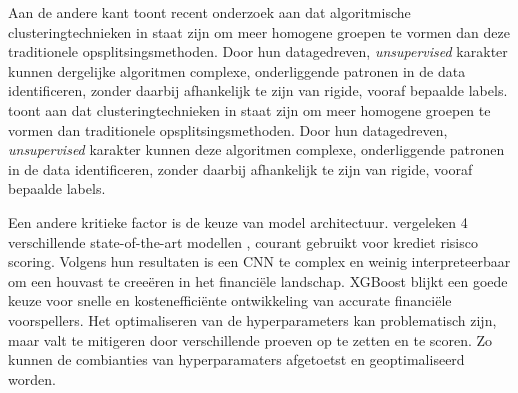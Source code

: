 Aan de andere kant toont recent onderzoek aan dat algoritmische clusteringtechnieken in staat zijn om meer homogene groepen te vormen dan deze traditionele opsplitsingsmethoden. Door hun datagedreven, \textit{unsupervised} karakter kunnen dergelijke algoritmen complexe, onderliggende patronen in de data identificeren, zonder daarbij afhankelijk te zijn van rigide, vooraf bepaalde labels. \autocite{hou2016financial, gulal2023predicting} toont aan dat clusteringtechnieken in staat zijn om meer homogene groepen te vormen dan traditionele opsplitsingsmethoden. Door hun datagedreven, \textit{unsupervised} karakter kunnen deze algoritmen complexe, onderliggende patronen in de data identificeren, zonder daarbij afhankelijk te zijn van rigide, vooraf bepaalde labels.

Een andere kritieke factor is de keuze van model architectuur. \textcite{chen2024} vergeleken 4 verschillende state-of-the-art modellen , courant gebruikt voor krediet risisco scoring. Volgens hun resultaten is een CNN te complex en weinig interpreteerbaar om een houvast te creeëren in het financiële landschap. XGBoost blijkt een goede keuze voor snelle en kostenefficiënte ontwikkeling van accurate financiële voorspellers. Het optimaliseren van de hyperparameters kan problematisch zijn, maar valt te mitigeren door verschillende proeven op te zetten en te scoren. Zo kunnen de combianties van hyperparamaters afgetoetst en geoptimaliseerd worden.